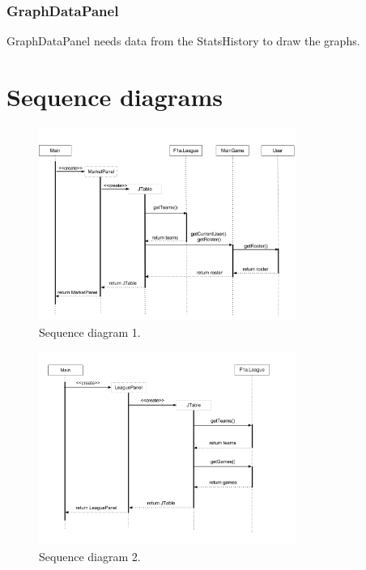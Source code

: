 \documentclass{article}
\begin{document}
\subsubsection{GraphDataPanel}
GraphDataPanel needs data from the StatsHistory to draw the graphs.


\newpage
\section{Sequence diagrams}
\begin{figure}[H]
\centering
\includegraphics[width=0.75\textwidth]{img/seq_diagram_1.png}
\caption{Sequence diagram 1.}
\end{figure}
\vspace*{-1cm}
\begin{figure}[H]
\centering
\includegraphics[width=0.75\textwidth]{img/seq_diagram_2.png}
\caption{Sequence diagram 2.}
\end{figure}
\end{document}
